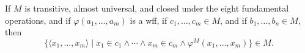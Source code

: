 If $M$ is transitive, almost universal, and closed under the eight fundamental operations, and if $\varphi(a_1, \ldots, a_m)$ is a wff, if $c_1, \ldots, c_m \in M$, and if $b_1, \ldots, b_n \in M$, then
$$\{\langle x_1, \ldots, x_m \rangle \mid x_1 \in c_1 \land \cdots \land x_m \in c_m \land \varphi^M(x_1, \ldots, x_m)\} \in M.$$
